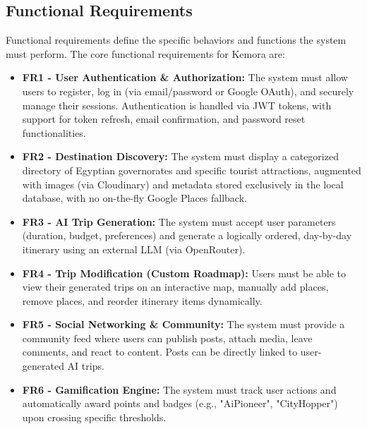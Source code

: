\subsection{Functional Requirements}
Functional requirements define the specific behaviors and functions the system must perform. The core functional requirements for Kemora are:
\begin{itemize}
    \item \textbf{FR1 - User Authentication \& Authorization:} The system must allow users to register, log in (via email/password or Google OAuth), and securely manage their sessions. Authentication is handled via JWT tokens, with support for token refresh, email confirmation, and password reset functionalities.
    \item \textbf{FR2 - Destination Discovery:} The system must display a categorized directory of Egyptian governorates and specific tourist attractions, augmented with images (via Cloudinary) and metadata stored exclusively in the local database, with no on-the-fly Google Places fallback.
    \item \textbf{FR3 - AI Trip Generation:} The system must accept user parameters (duration, budget, preferences) and generate a logically ordered, day-by-day itinerary using an external LLM (via OpenRouter).
    \item \textbf{FR4 - Trip Modification (Custom Roadmap):} Users must be able to view their generated trips on an interactive map, manually add places, remove places, and reorder itinerary items dynamically.
    \item \textbf{FR5 - Social Networking \& Community:} The system must provide a community feed where users can publish posts, attach media, leave comments, and react to content. Posts can be directly linked to user-generated AI trips.
    \item \textbf{FR6 - Gamification Engine:} The system must track user actions and automatically award points and badges (e.g., "AiPioneer", "CityHopper") upon crossing specific thresholds.
\end{itemize}


